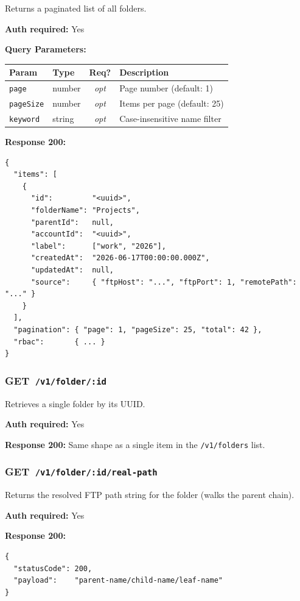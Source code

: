 \documentclass[12pt,a4paper]{article}
\newcommand{\httpget}[1]{%
  \colorbox{getcolor!20}{\textcolor{getcolor}{\textbf{\small GET}}}~\texttt{#1}%
}
\newcommand{\optional}{\textcolor{muted}{\textit{opt}}}
\begin{document}
Returns a paginated list of all folders.

\textbf{Auth required:} Yes

\textbf{Query Parameters:}

\begin{tabularx}{\linewidth}{llcX}
\toprule
\textbf{Param} & \textbf{Type} & \textbf{Req?} & \textbf{Description} \\
\midrule
\texttt{page}     & number & \optional & Page number (default: 1) \\
\texttt{pageSize} & number & \optional & Items per page (default: 25) \\
\texttt{keyword}  & string & \optional & Case-insensitive name filter \\
\bottomrule
\end{tabularx}

\textbf{Response 200:}
\begin{lstlisting}
{
  "items": [
    {
      "id":         "<uuid>",
      "folderName": "Projects",
      "parentId":   null,
      "accountId":  "<uuid>",
      "label":      ["work", "2026"],
      "createdAt":  "2026-06-17T00:00:00.000Z",
      "updatedAt":  null,
      "source":     { "ftpHost": "...", "ftpPort": 1, "remotePath": "..." }
    }
  ],
  "pagination": { "page": 1, "pageSize": 25, "total": 42 },
  "rbac":       { ... }
}
\end{lstlisting}

\vspace{0.5em}
\subsubsection{\httpget{/v1/folder/:id}}

Retrieves a single folder by its UUID.

\textbf{Auth required:} Yes

\textbf{Response 200:} Same shape as a single item in the \texttt{/v1/folders} list.

\vspace{0.5em}
\subsubsection{\httpget{/v1/folder/:id/real-path}}

Returns the resolved FTP path string for the folder (walks the parent chain).

\textbf{Auth required:} Yes

\textbf{Response 200:}
\begin{lstlisting}
{
  "statusCode": 200,
  "payload":    "parent-name/child-name/leaf-name"
}
\end{lstlisting}
\end{document}
